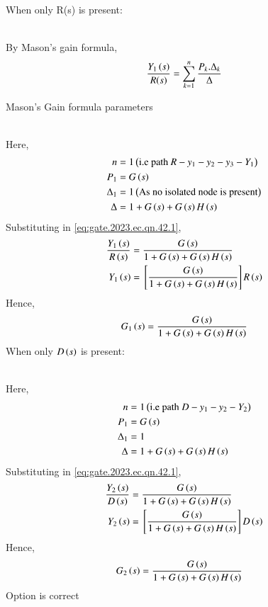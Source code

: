 \documentclass[journal,12pt,onecolumn]{IEEEtran}
\theoremstyle{remark}
\begin{document}
When only R(s) is present:\\
\begin{figure}[ht!]
\centering

\end{figure}\\
By Mason's gain formula, 
\begin{align}
 \frac{Y_1\left(s\right)}{R(s)} = \sum_{k=1}^n \frac{P_k.\Delta{_k}}{\Delta} \label{eq:gate.2023.ec.qn.42.1}
\end{align}
\begin{table}[ht!]
\centering

\caption{Mason's Gain formula parameters}
\end{table}\\
Here, 
\begin{align}
 n&=1\left(\text{i.e path } R-y_1-y_2-y_3-Y_1\right)\\
 P_1&= G\left(s\right)\\
 \Delta{_1}&= 1 \left(\text{As no isolated node is present}\right)\\
 \Delta &= 1+ G\left(s\right) + G\left(s\right)H\left(s\right)
\end{align}
Substituting in \eqref{eq:gate.2023.ec.qn.42.1},
\begin{align}
\frac{Y_1\left(s\right)}{R\left(s\right)} &= \frac{G\left(s\right)}{1+G\left(s\right) + G\left(s\right)H\left(s\right)}\\
Y_1\left(s\right) &= {}\left[\frac{G\left(s\right)}{1+ G\left(s\right)+ G\left(s\right)H\left(s\right)}\right] R\left(s\right)
\end{align}
Hence,
\begin{align}
 G_1\left(s\right) = \frac{G\left(s\right)}{1+G\left(s\right)+G\left(s\right)H\left(s\right)}
\end{align}
When only $D\left(s\right)$ is present:
\begin{figure}[ht!]
\centering

\end{figure}\\
Here, 
\begin{align}
 n&=1\left(\text{i.e path } D-y_1-y_2-Y_2\right)\\
 P_1&= G\left(s\right)\\
 \Delta{_1}&= 1 \\
 \Delta &= 1+ G\left(s\right) + G\left(s\right)H\left(s\right)
\end{align}
Substituting in \eqref{eq:gate.2023.ec.qn.42.1},
\begin{align}
\frac{Y_2\left(s\right)}{D\left(s\right)}&= \frac{G\left(s\right)}{1+ G\left(s\right)+G\left(s\right)H\left(s\right)}\\
Y_2\left(s\right)&= {}\left[\frac{G\left(s\right)}{1+ G\left(s\right)+ G\left(s\right)H\left(s\right)}\right] D\left(s\right)
\end{align}
Hence,
\begin{align}
G_2\left(s\right) &= \frac{G\left(s\right)}{1+ G\left(s\right)+ G\left(s\right)H\left(s\right)}
\end{align}
Option  is correct
\end{document}
